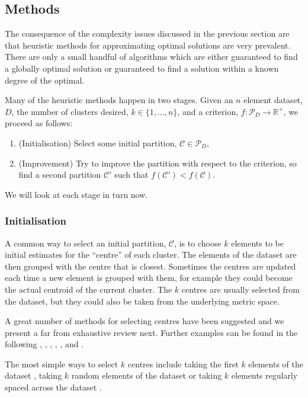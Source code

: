 \documentclass[a4paper]{report}
\newcommand{\dset}{D}
\newcommand{\clus}{\mathcal{C}}
\newcommand{\parts}{\mathcal{P}}
\begin{document}
\subsection{Methods}
\label{sec:methods}

The consequence of the complexity issues discussed in the previous section are
that heuristic methods for approximating optimal solutions are very
prevalent.  There are only a small handful of algorithms which are either
guaranteed to find a globally optimal solution or guaranteed to find a
solution within a known degree of the optimal.

Many of the heuristic methods happen in two stages.  Given an $n$ element
dataset, $\dset$, the number of clusters desired, $k \in \{1,\dotsc,n\}$, and
a criterion, $f \colon \parts_{\dset} \to \mathbb{R}^+$, we proceed as
follows:
\begin{enumerate}
\item (Initialisation) Select some initial partition, $\clus
  \in \parts_{\dset}$,
\item (Improvement) Try to improve the partition with respect to the
  criterion, so find a second partition $\clus'$ such that $f(\clus') <
  f(\clus)$.
\end{enumerate}
We will look at each stage in turn now.

\subsubsection{Initialisation}
\label{sec:initialisation}

A common way to select an initial partition, $\clus$, is to choose $k$
elements to be initial estimates for the ``centre'' of each cluster.  The
elements of the dataset are then grouped with the centre that is closest.
Sometimes the centres are updated each time a new element is grouped with
them, for example they could become the actual centroid of the current
cluster.  The $k$ centres are usually selected from the dataset, but they
could also be taken from the underlying metric space.

A great number of methods for selecting centres have been suggested and we
present a far from exhaustive review next.  Further examples can be found in
the following \citep{he2004initialization}, \citep{khan2004clusterecenter},
\citep{cao09initialization}, \citep{yedla2010enhancing},
\citep{zhang2009initialcenters}, \citep{Erisoglu2011intiailcenters} and
\citep{redmond2007method}.

The most simple ways to select $k$ centres include taking the first $k$
elements of the dataset \citep{macqueen1967some}, taking $k$ random elements
of the dataset \citep{forgy65cluster} or taking $k$ elements regularly spaced
across the dataset \citep{beale1969euclidean}.
\end{document}
